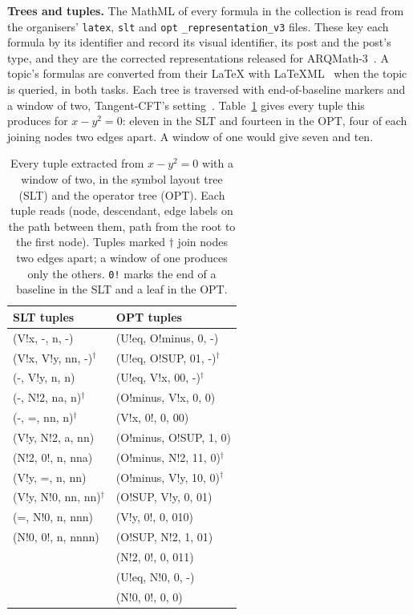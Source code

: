 \textbf{Trees and tuples.} The MathML of every formula in the collection is read from the
organisers' \texttt{latex}, \texttt{slt} and \texttt{opt} \texttt{\_representation\_v3}
files. These key each formula by its identifier and record its visual identifier, its post
and the post's type, and they are the corrected representations released for
ARQMath-3~\cite{mansouri2022arqmath3}. A topic's formulas are converted from their \LaTeX{}
with LaTeXML~\cite{millerlatexml} when the topic is queried, in both tasks. Each tree is
traversed with end-of-baseline markers and a window of two, Tangent-CFT's
setting~\cite{mansouri2019tangentcft}. Table~\ref{tab:met-tuples} gives every tuple this
produces for $x - y^2 = 0$: eleven in the SLT and fourteen in the OPT, four of each joining
nodes two edges apart. A window of one would give seven and ten.

\begin{table}[t]
\centering
\begin{tabular}{@{}ll@{}}
\toprule
\textbf{SLT tuples} & \textbf{OPT tuples} \\
\midrule
\ttfamily (V!x, -, n, -)              & \ttfamily (U!eq, O!minus, 0, -) \\
\ttfamily (V!x, V!y, nn, -)$^\dagger$ & \ttfamily (U!eq, O!SUP, 01, -)$^\dagger$ \\
\ttfamily (-, V!y, n, n)              & \ttfamily (U!eq, V!x, 00, -)$^\dagger$ \\
\ttfamily (-, N!2, na, n)$^\dagger$   & \ttfamily (O!minus, V!x, 0, 0) \\
\ttfamily (-, =, nn, n)$^\dagger$     & \ttfamily (V!x, 0!, 0, 00) \\
\ttfamily (V!y, N!2, a, nn)           & \ttfamily (O!minus, O!SUP, 1, 0) \\
\ttfamily (N!2, 0!, n, nna)           & \ttfamily (O!minus, N!2, 11, 0)$^\dagger$ \\
\ttfamily (V!y, =, n, nn)             & \ttfamily (O!minus, V!y, 10, 0)$^\dagger$ \\
\ttfamily (V!y, N!0, nn, nn)$^\dagger$ & \ttfamily (O!SUP, V!y, 0, 01) \\
\ttfamily (=, N!0, n, nnn)            & \ttfamily (V!y, 0!, 0, 010) \\
\ttfamily (N!0, 0!, n, nnnn)          & \ttfamily (O!SUP, N!2, 1, 01) \\
                                      & \ttfamily (N!2, 0!, 0, 011) \\
                                      & \ttfamily (U!eq, N!0, 0, -) \\
                                      & \ttfamily (N!0, 0!, 0, 0) \\
\bottomrule
\end{tabular}
\caption[Tuples extracted from a worked formula]{Every tuple extracted from $x - y^2 = 0$ with a window of two, in the symbol layout
tree (SLT) and the operator tree (OPT). Each tuple reads (node, descendant, edge labels on
the path between them, path from the root to the first node). Tuples marked $\dagger$ join
nodes two edges apart; a window of one produces only the others. \texttt{0!} marks the end
of a baseline in the SLT and a leaf in the OPT.}
\label{tab:met-tuples}
\end{table}


